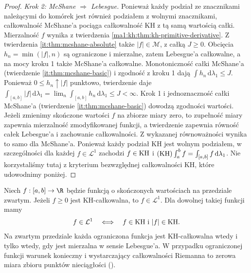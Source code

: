 \begin{proof}
\emph{Krok 2: McShane $\Rightarrow$ Lebesgue.} Ponieważ każdy podział ze znacznikami należącymi do komórek jest również podziałem z wolnymi znacznikami, całkowalność McShane'a pociąga całkowalność KH z tą samą wartością całki. Mierzalność $f$ wynika z twierdzenia \ref{ma1:kh:thm:kh-primitive-derivative}. Z twierdzenia \ref{it:thm:mcshane-absolute} także $|f|\in\mathcal M$, z całką $J\ge0$. Obcięcia $h_n=\min(|f|,n)$ są ograniczone i mierzalne, zatem Lebesgue'a całkowalne, a na mocy kroku 1 także McShane'a całkowalne. Monotoniczność całki McShane'a (twierdzenie \ref{it:thm:mcshane-basic}) i zgodność z kroku 1 dają $\int h_n\,\mathrm d\lambda_1\le J$. Ponieważ $0\le h_n\uparrow |f|$ punktowo, twierdzenie  daje $\int_{[a,b]}|f|\,\mathrm d\lambda_1=\lim_n\int_{[a,b]}h_n\,\mathrm d\lambda_1\le J<\infty$. Krok 1 i jednoznaczność całki McShane'a
(twierdzenie \ref{it:thm:mcshane-basic})
dowodzą zgodności wartości. Jeżeli zmienimy
skończone wartości $f$ na zbiorze miary zero,
to zupełność miary zapewnia mierzalność zmodyfikowanej
funkcji, a twierdzenie 
zapewnia równość całek Lebesgue'a i zachowanie
całkowalności. Z wykazanej równoważności wynika to
samo dla McShane'a. Ponieważ każdy podział KH jest
wolnym podziałem, w szczególności dla każdej
$f\in\mathcal L^1$ zachodzi $f\in\mathrm{KH}$ i
$(\mathrm{KH})\int_a^b f=\int_{[a,b]}f\,\mathrm d\lambda_1$.
Nie korzystaliśmy tutaj z kryterium bezwzględnej
całkowalności KH, które udowodnimy poniżej.
\end{proof}
\begin{twierdzenie}\label{ma1:kh:thm:kh-absolute}\label{it:thm:hk-absolute-integrability}
Niech $f:[a,b]\to\R$ będzie funkcją o skończonych wartościach na przedziale zwartym. Jeżeli $f\ge0$ jest KH-całkowalna, to $f\in\mathcal L^1$. Dla dowolnej takiej funkcji mamy
\[
f\in\mathcal L^1\quad\Longleftrightarrow\quad f\in\mathrm{KH}\ \text{i}\ |f|\in\mathrm{KH}.
\]
Na zwartym przedziale każda ograniczona funkcja jest KH-całkowalna wtedy i tylko wtedy, gdy jest mierzalna w sensie Lebesgue'a. W przypadku ograniczonej funkcji warunek konieczny i wystarczający całkowalności Riemanna to zerowa miara zbioru punktów nieciągłości ().
\end{twierdzenie}
